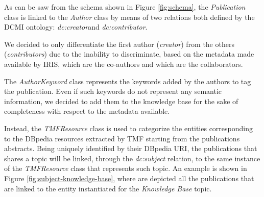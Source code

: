 \documentclass[%
    corpo=13.5pt,
    twoside,
    oldstyle,
    tipotesi=magistrale,
    greek,
    evenboxes
]{toptesi}
\begin{document}
As can be saw from the schema shown in Figure \ref{fig:schema}, the
\emph{Publication} class is linked to the \emph{Author} class by means of two
relations both defined by the DCMI ontology:
\emph{dc:creator}\footnotemark and \emph{dc:contributor}\footnotemark[\value{footnote}].

We decided to only differentiate the first author (\emph{creator}) from
the others (\emph{contributors}) due to the inability to discriminate, based
on the metadata made available by IRIS, which are
the co-authors and which are the collaborators.

The \emph{AuthorKeyword} class represents the keywords added by the authors
to tag the publication.
Even if such keywords do not represent any semantic information, we decided to
add them to the knowledge base for the sake of completeness with respect to
the metadata available.

Instead, the \emph{TMFResource} class is used to categorize the entities
corresponding to the DBpedia resources extracted by TMF starting from the
publications abstracts.
Being uniquely identified by their DBpedia URI, the publications that shares
a topic will be linked, through the \emph{dc:subject} relation, to the same
instance of the \emph{TMFResource} class that represents such topic.
An example is shown in Figure \ref{fig:subject-knowledge-base}, where are
depicted all the publications that are linked to the entity instantiated for
the \emph{Knowledge Base} topic.
\end{document}
